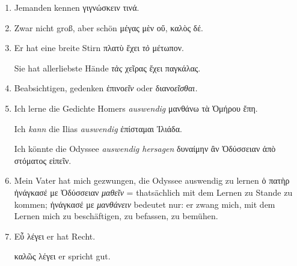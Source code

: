 \begin{enumerate}[leftmargin=0pt,rightmargin=0pt,listparindent =1cm,labelindent=1cm,labelsep=1ex,labelwidth={*},itemindent={*},align=left]
\begin{continuousitemline}hier (dem Ort des Sprechenden \emph{nahe})
\textgreek[variant=ancient]{ἐνταῦθα,}


hier (= \emph{an Ort und Stelle,} am Orte selbst) \textgreek[variant=ancient]{αὐτοῦ.}\par\end{continuousitemline}

\item Jemanden kennen \textgreek[variant=ancient]{γιγνώσκειν τινά.}
\item Zwar nicht groß, aber schön \textgreek[variant=ancient]{μέγας μὲν
οὔ, καλὸς δέ.}
\item Er hat eine breite Stirn \textgreek[variant=ancient]{πλατὺ ἔχει \emph{τὸ}
μέτωπον.}


Sie hat allerliebste Hände \textgreek[variant=ancient]{\emph{τὰς}
χεῖρας ἔχει παγκάλας.}

\item Beabsichtigen, gedenken \textgreek[variant=ancient]{ἐπινο\emph{εῖν}}
oder \textgreek[variant=ancient]{διανο\emph{εῖσθαι.}}
\item Ich lerne die Gedichte Homers \emph{auswendig} \textgreek[variant=ancient]{μανθάνω
τὰ Ὁμήρου ἔπη.}


\begin{continuousitemline}Ich \emph{kann} die Ilias \emph{auswendig}
\textgreek[variant=ancient]{ἐπίσταμαι Ἰλιάδα.}


Ich könnte die Odyssee \emph{auswendig hersagen} \textgreek[variant=ancient]{δυναίμην
ἂν Ὀδύσσειαν ἀπὸ στόματος εἰπεῖν. }\par\end{continuousitemline}

\item Mein Vater hat mich gezwungen, die Odyssee auswendig zu lernen \textgreek[variant=ancient]{ὁ
πατὴρ ἠνάγκασέ με Ὀδύσσειαν \emph{μαθεῖν}} = that\textcompwordmark{}sächlich
mit dem Lernen zu Stande zu kommen; \textgreek[variant=ancient]{ἠνάγκασέ
με \emph{μανθάνειν}} bedeutet nur: er zwang mich, mit dem Lernen mich
zu beschäftigen, zu befassen, zu bemühen. 
\item \textgreek[variant=ancient]{Εὖ λέγει }er hat Recht.


\begin{continuousitemline}\textgreek[variant=ancient]{καλῶς λέγει}
er spricht gut.\par\end{continuousitemline}


\end{enumerate}
